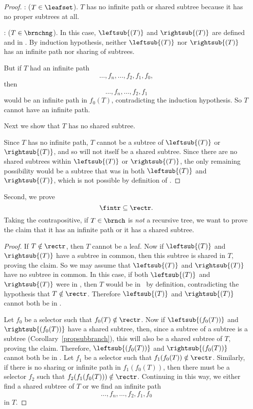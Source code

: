 \begin{definition}
\begin{proof}
: ($T \in \leafset$).  $T$ has no infinite path
or shared subtree because it has no proper subtrees at all.

: ($T \in \brnchng$).  In this case,
$\leftsub{(T)}$ and $\rightsub{(T)}$ are defined and in \rectr.  By
induction hypothesis, neither $\leftsub{(T)}$ nor $\rightsub{(T)}$ has an
infinite path nor sharing of subtrees.

But if $T$ had an infinite path
\[
\dots,f_n,\dots, f_2,f_1,f_0,
\]
then
\begin{equation}\label{dfnf2f1}
\dots,f_n,\dots,f_2,f_1
\end{equation}
would be an infinite path in $f_0(T)$, contradicting the induction
hypothesis.  So $T$ cannot have an infinite path.

Next we show that $T$ has no shared subtree.

Since $T$ has no infinite path, $T$ cannot be a subtree of
$\leftsub{(T)}$ or $\rightsub{(T)}$, and so will not itself be a
shared subtree.  Since there are no shared subtrees within
$\leftsub{(T)}$ or $\rightsub{(T)}$, the only remaining possibility
would be a subtree that was in both $\leftsub{(T)}$ and
$\rightsub{(T)}$, which is not possible by definition of \rectr.
\end{proof}

Second, we prove
\begin{equation}\label{fintrsubrectr}
\fintr \subseteq \rectr.
\end{equation}
Taking the contrapositive, if $T \in \brnch$ is \emph{not} a recursive
tree, we want to prove the claim that it has an infinite path or it
has a shared subtree.

\begin{proof}
If $T \notin \rectr$, then $T$ cannot be a leaf.  Now if
$\leftsub{(T)}$ and $\rightsub{(T)}$ have a subtree in common, then
this subtree is shared in $T$, proving the claim.  So we may assume
that $\leftsub{(T)}$ and $\rightsub{(T)}$ have no subtree in common.
In this case, if both $\leftsub{(T)}$ and $\rightsub{(T)}$ were in
\rectr, then $T$ would be in \rectr\ by definition, contradicting the
hypothesis that $T \notin \rectr$.  Therefore $\leftsub{(T)}$ and
$\rightsub{(T)}$ cannot both be in \rectr.

Let $f_0$ be a selector such that $f_0(T) \notin \rectr$.  Now if
$\leftsub{(f_0(T))}$ and $\rightsub{(f_0(T))}$ have a shared subtree,
then, since a subtree of a subtree is a subtree
(Corollary~\ref{propsubbranch}), this will also be a shared subtree of
$T$, proving the claim.  Therefore, $\leftsub{(f_0(T))}$ and
$\rightsub{(f_0(T))}$ cannot both be in \rectr.  Let $f_1$ be a
selector such that $f_1(f_0(T)) \notin \rectr$.  Similarly, if there
is no sharing or infinite path in $f_1(f_0(T))$, then there must be a
selector $f_2$ such that $f_2(f_1(f_0(T))) \notin \rectr$.  Continuing
in this way, we either find a shared subtree of $T$ or we find an
infinite path
\[
\dots,f_n,\dots, f_2,f_1,f_0
\]
in $T$.
\end{proof}


\end{definition}
